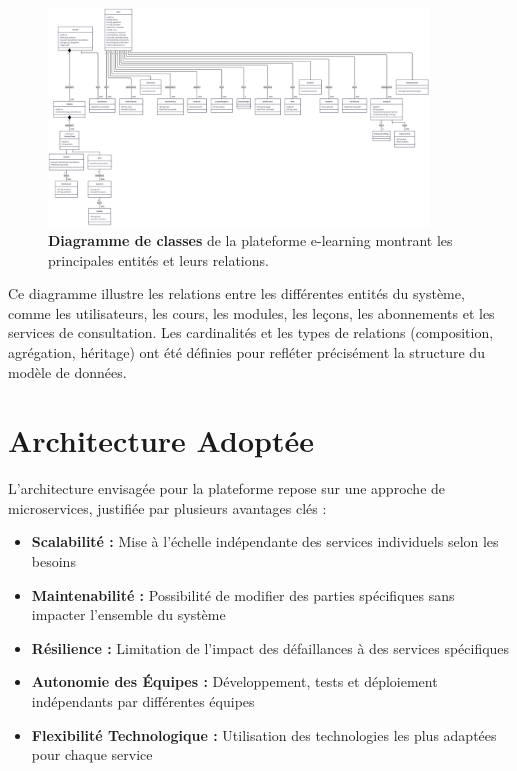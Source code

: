 \begin{figure}[p]
  \centering
  \includegraphics[width=0.9\textwidth,keepaspectratio]{week_1_img/class_diagrame.png}
  \caption{\textbf{Diagramme de classes} de la plateforme e-learning montrant les principales entités et leurs relations.}
  \label{fig:class_diagram}
\end{figure}

Ce diagramme illustre les relations entre les différentes entités du système, comme les utilisateurs, les cours, les modules, les leçons, les abonnements et les services de consultation. Les cardinalités et les types de relations (composition, agrégation, héritage) ont été définies pour refléter précisément la structure du modèle de données.
\clearpage

\section{Architecture Adoptée}

L'architecture envisagée pour la plateforme repose sur une approche de microservices, justifiée par plusieurs avantages clés :
\begin{itemize}
  \item \textbf{Scalabilité :} Mise à l'échelle indépendante des services individuels selon les besoins
  \item \textbf{Maintenabilité :} Possibilité de modifier des parties spécifiques sans impacter l'ensemble du système
  \item \textbf{Résilience :} Limitation de l'impact des défaillances à des services spécifiques
  \item \textbf{Autonomie des Équipes :} Développement, tests et déploiement indépendants par différentes équipes
  \item \textbf{Flexibilité Technologique :} Utilisation des technologies les plus adaptées pour chaque service
\end{itemize}

